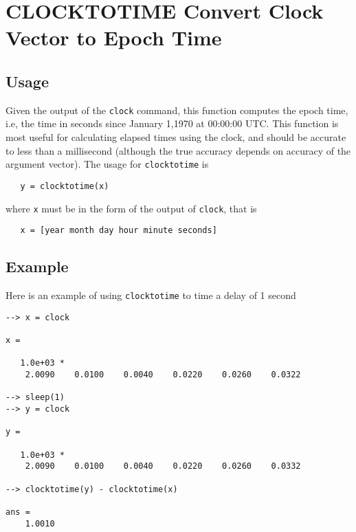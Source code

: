 \section{CLOCKTOTIME Convert Clock Vector to Epoch Time}

\subsection{Usage}

Given the output of the \verb|clock| command, this function computes
the epoch time, i.e, the time in seconds since January 1,1970 
at 00:00:00 UTC.  This function is most useful for calculating elapsed
times using the clock, and should be accurate to less than a millisecond
(although the true accuracy depends on accuracy of the argument vector). 
The usage for \verb|clocktotime| is
\begin{verbatim}
   y = clocktotime(x)
\end{verbatim}
where \verb|x| must be in the form of the output of \verb|clock|, that is
\begin{verbatim}
   x = [year month day hour minute seconds]
\end{verbatim}
\subsection{Example}

Here is an example of using \verb|clocktotime| to time a delay of 1 second
\begin{verbatim}
--> x = clock

x = 

   1.0e+03 * 
    2.0090    0.0100    0.0040    0.0220    0.0260    0.0322 

--> sleep(1)
--> y = clock

y = 

   1.0e+03 * 
    2.0090    0.0100    0.0040    0.0220    0.0260    0.0332 

--> clocktotime(y) - clocktotime(x)

ans = 
    1.0010 
\end{verbatim}
